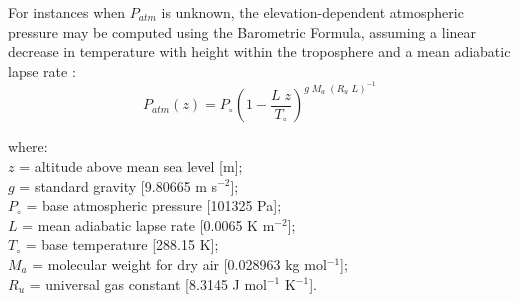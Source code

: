 \noindent For instances when $P_{atm}$ is unknown, the elevation-dependent atmospheric pressure may be computed using the Barometric Formula, assuming a linear decrease in temperature with height within the troposphere and a mean adiabatic lapse rate \parencite{berberan97}:
%
\begin{equation}
\label{eq:pz}
    P_{atm}\left( z \right) = P_{\circ} \left( 
    	1 - \frac{L\; z}{T_{\circ}} 
    \right)^{g\; M_a\; \left(R_u\; L\right)^{-1}}
\end{equation}

\noindent where:\\
\indent $z$ = altitude above mean sea level [m];\\
\indent $g$ = standard gravity [9.80665 m s$^{-2}$];\\
\indent $P_{\circ}$ = base atmospheric pressure [101325 Pa];\\
\indent $L$ = mean adiabatic lapse rate [0.0065 K m$^{-2}$];\\
\indent $T_{\circ}$ = base temperature [288.15 K];\\
\indent $M_a$ = molecular weight for dry air [0.028963 kg mol$^{-1}$];\\
\indent $R_u$ = universal gas constant [8.3145 J mol$^{-1}$ K$^{-1}$].\\

